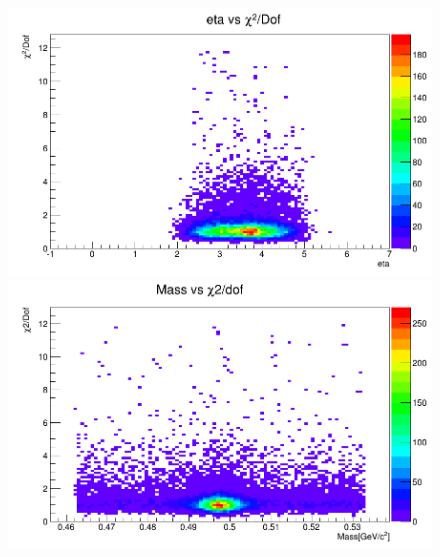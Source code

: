 \begin{figure}[H]    
\begin{minipage}[t]{0.5\textwidth}
\includegraphics[width=\linewidth]{rozdzial6/JPsi_eta_chi2.png}
\end{minipage}
\hspace{\fill}
\begin{minipage}[t]{0.5\textwidth}
\includegraphics[width=\linewidth]{rozdzial6/JPsi_mass_chi2.png}
\end{minipage}


\end{figure}
